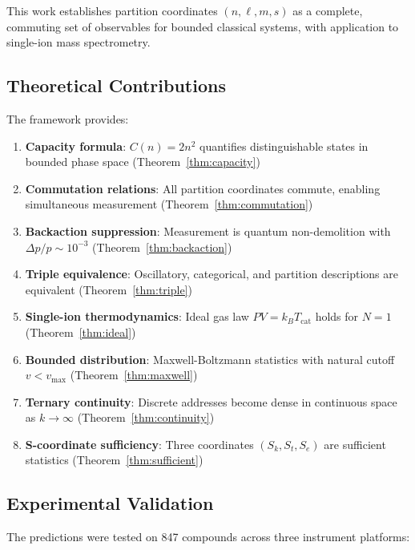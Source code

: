This work establishes partition coordinates $(n, \ell, m, s)$ as a complete, commuting set of observables for bounded classical systems, with application to single-ion mass spectrometry.

\subsection{Theoretical Contributions}

The framework provides:

\begin{enumerate}
    \item \textbf{Capacity formula}: $C(n) = 2n^2$ quantifies distinguishable states in bounded phase space (Theorem~\ref{thm:capacity})
    \item \textbf{Commutation relations}: All partition coordinates commute, enabling simultaneous measurement (Theorem~\ref{thm:commutation})
    \item \textbf{Backaction suppression}: Measurement is quantum non-demolition with $\Delta p/p \sim 10^{-3}$ (Theorem~\ref{thm:backaction})
    \item \textbf{Triple equivalence}: Oscillatory, categorical, and partition descriptions are equivalent (Theorem~\ref{thm:triple})
    \item \textbf{Single-ion thermodynamics}: Ideal gas law $PV = k_B T_{\mathrm{cat}}$ holds for $N=1$ (Theorem~\ref{thm:ideal})
    \item \textbf{Bounded distribution}: Maxwell-Boltzmann statistics with natural cutoff $v < v_{\max}$ (Theorem~\ref{thm:maxwell})
    \item \textbf{Ternary continuity}: Discrete addresses become dense in continuous space as $k \to \infty$ (Theorem~\ref{thm:continuity})
    \item \textbf{S-coordinate sufficiency}: Three coordinates $(S_k, S_t, S_e)$ are sufficient statistics (Theorem~\ref{thm:sufficient})
\end{enumerate}

\subsection{Experimental Validation}

The predictions were tested on 847 compounds across three instrument platforms:

